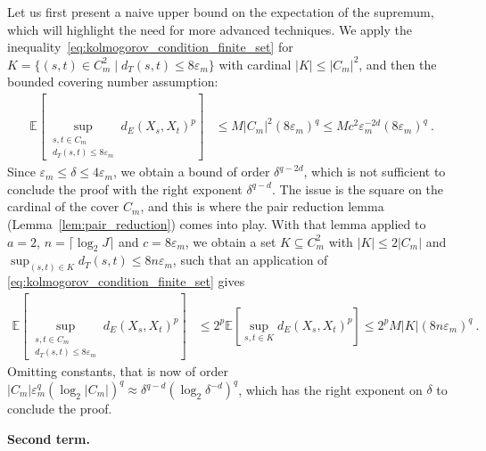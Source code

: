 \documentclass[lean]{Draft}
\begin{document}
Let us first present a naive upper bound on the expectation of the supremum, which will highlight the need for more advanced techniques.
We apply the inequality~\eqref{eq:kolmogorov_condition_finite_set} for $K = \{(s,t) \in C_m^2 \mid d_T(s, t) \le 8 \varepsilon_m\}$ with cardinal $\lvert K \rvert \le \lvert C_m \rvert^2$, and then the bounded covering number assumption:
\begin{align*}
  \mathbb{E}\left[ \sup_{\substack{s, t \in C_m \\ d_T(s, t) \le 8 \varepsilon_m}} d_E(X_s, X_t)^p \right]
  &\le M \lvert C_m \rvert^2 (8 \varepsilon_m)^q
  \le M c^2 \varepsilon_m^{-2d} (8 \varepsilon_m)^q
  \: .
\end{align*}
Since $\varepsilon_m \le \delta \le 4 \varepsilon_m$, we obtain a bound of order $\delta^{q - 2d}$, which is not sufficient to conclude the proof with the right exponent $\delta^{q - d}$.
The issue is the square on the cardinal of the cover $C_m$, and this is where the pair reduction lemma (Lemma~\ref{lem:pair_reduction}) comes into play.
With that lemma applied to $a = 2$, $n = \lceil \log_2 J \rceil$ and $c = 8 \varepsilon_m$, we obtain a set $K \subseteq C_m^2$ with $\lvert K \rvert \le 2 \lvert C_m \rvert$ and $\sup_{(s, t) \in K} d_T(s, t) \le 8 n \varepsilon_m$, such that an application of \eqref{eq:kolmogorov_condition_finite_set} gives
\begin{align*}
  \mathbb{E}\left[ \sup_{\substack{s, t \in C_m \\ d_T(s, t) \le 8 \varepsilon_m}} d_E(X_s, X_t)^p \right]
  &\le 2^p \mathbb{E}\left[ \sup_{s, t \in K} d_E(X_s, X_t)^p \right]
  \le 2^p M \lvert K \rvert (8 n \varepsilon_m)^q
  \: .
\end{align*}
Omitting constants, that is now of order
$\lvert C_m \rvert \varepsilon_m^q (\log_2 \lvert C_m\rvert)^q \approx \delta^{q - d} \left(\log_2 \delta^{-d} \right)^q
$, which has the right exponent on $\delta$ to conclude the proof.

\textbf{Second term.}
\end{document}
